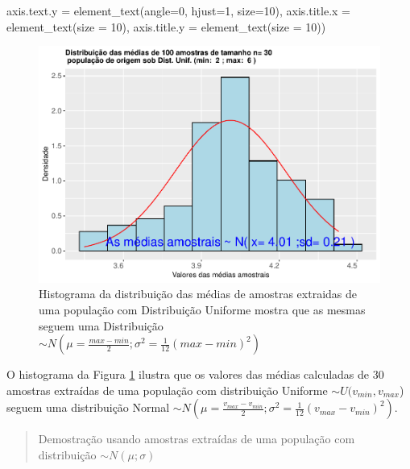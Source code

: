 \documentclass[
]{book}
\newenvironment{Shaded}{\begin{snugshade}}{\end{snugshade}}
\newcommand{\AttributeTok}[1]{\textcolor[rgb]{0.77,0.63,0.00}{#1}}
\newcommand{\DecValTok}[1]{\textcolor[rgb]{0.00,0.00,0.81}{#1}}
\newcommand{\FunctionTok}[1]{\textcolor[rgb]{0.00,0.00,0.00}{#1}}
\newcommand{\NormalTok}[1]{#1}
\begin{document}
\begin{Shaded}
\begin{Highlighting}[]
        \AttributeTok{axis.text.y =} \FunctionTok{element\_text}\NormalTok{(}\AttributeTok{angle=}\DecValTok{0}\NormalTok{, }\AttributeTok{hjust=}\DecValTok{1}\NormalTok{, }\AttributeTok{size=}\DecValTok{10}\NormalTok{),}
        \AttributeTok{axis.title.x =} \FunctionTok{element\_text}\NormalTok{(}\AttributeTok{size =} \DecValTok{10}\NormalTok{),}
        \AttributeTok{axis.title.y =} \FunctionTok{element\_text}\NormalTok{(}\AttributeTok{size =} \DecValTok{10}\NormalTok{))}
\end{Highlighting}
\end{Shaded}

\begin{figure}

{\centering \includegraphics[width=1\linewidth]{apostila_files/figure-latex/fig48-1} 

}

\caption{Histograma da distribuição das médias de amostras extraidas de uma população com Distribuição Uniforme mostra que as mesmas seguem uma Distribuição $\sim N (\mu= \frac{max-min}{2};\sigma^2=\frac{1}{12}(max-min)^2)$}\label{fig:fig48}
\end{figure}

\hfill\break

O histograma da Figura \ref{fig:fig48} ilustra que os valores das médias calculadas de 30 amostras extraídas de uma população com distribuição Uniforme \(\sim U (v_{min}, v_{max}\)) seguem uma distribuição Normal \(\sim N (\mu= \frac{v_{max}-v_{min}}{2}; \sigma^2=\frac{1}{12}(v_{max}-v_{min})^2)\).

\hfill\break

\begin{quote}
Demostração usando amostras extraídas de uma população com distribuição \(\sim N (\mu;\sigma)\)
\end{quote}
\end{document}
